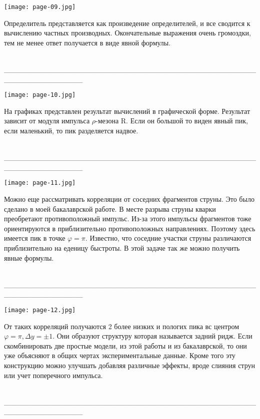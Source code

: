 \documentclass[12pt]{article}
\renewcommand{\phi}{\varphi}
\def\Dy{\Delta y}
\def\ro{$\rho$}
\renewcommand{\line}{\\ \_\_\_\_\_\_\_\_\_\_\_\_\_\_\_\_\_\_\_\_\_\_\_\_\_\_\_\_\_\_\_\_\_\_\_\_\_\_\_\_\_\_\_\_\_\_\_\_\_\_\_\_\_\_\_\_\_\_\_\_\_\_\_ \\ }
\begin{document}
\begin{minipage}[h]{0.29\linewidth}
	\texttt{[image: page-09.jpg]}
\end{minipage}
\begin{minipage}[h]{0.7\linewidth}
	Определитель представляется как произведение определителей, и все сводится к вычислению частных производных. Окончательные выражения очень громоздки, тем не менее ответ получается в виде явной формулы.
\end{minipage}
\line

\begin{minipage}[h]{0.29\linewidth}
	\texttt{[image: page-10.jpg]}
\end{minipage}
\begin{minipage}[h]{0.7\linewidth}
	На графиках представлен результат вычислений в графической форме. Результат зависит от модуля импульса \ro-мезона R. Если он большой то виден явный пик, если маленький, то пик разделяется надвое.
\end{minipage}
\line

\begin{minipage}[h]{0.29\linewidth}
	\texttt{[image: page-11.jpg]}
\end{minipage}
\begin{minipage}[h]{0.7\linewidth}
	Можно еще рассматривать корреляции от соседних фрагментов струны. Это было сделано в моей бакалаврской работе. В месте разрыва струны кварки преобретают противоположный импульс. Из-за этого импульсы фрагментов тоже ориентируются в приблизительно противоположных направлениях. Поэтому здесь имеется пик в точке $\phi = \pi$. Известно, что соседние участки струны различаются приблизительно на еденицу быстроты. В этой задаче так же можно получить явные формулы.
\end{minipage}
\line

\begin{minipage}[h]{0.29\linewidth}
	\texttt{[image: page-12.jpg]}
\end{minipage}
\begin{minipage}[h]{0.7\linewidth}
	От таких корреляций получаются 2 более низких и пологих пика вс центром $\phi = \pi, \Dy = \pm 1$. Они образуют структуру которая называется задний ридж. Если скомбинировать две простые модели, из этой работы и из бакалаврской, то они уже объясняют в общих чертах экспериментальные данные. Кроме того эту конструкцию можно улучшать добавляя различные эффекты, вроде слияния струн или учет поперечного импульса.
\end{minipage}
\line
\end{document}
